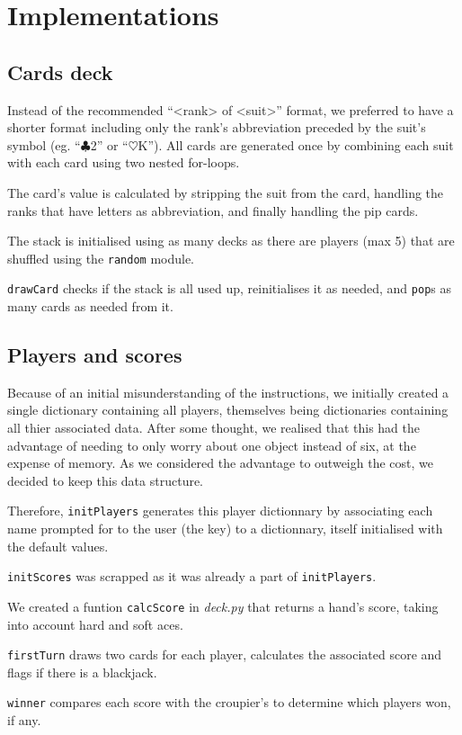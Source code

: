 \documentclass[a4paper, twoside]{report}
\begin{document}
    \section{Implementations}

        \subsection{Cards deck}
            Instead of the recommended ``<rank> of <suit>'' format, we preferred to have a shorter format including only the rank's abbreviation preceded by the suit's symbol (eg. ``$\clubsuit$2'' or ``$\heartsuit$K''). All cards are generated once by combining each suit with each card using two nested for-loops.
            \par The card's value is calculated by stripping the suit from the card, handling the ranks that have letters as abbreviation, and finally handling the pip cards.
            \par The stack is initialised using as many decks as there are players (max 5) that are shuffled using the \texttt{random} module.
            \par \texttt{drawCard} checks if the stack is all used up, reinitialises it as needed, and \texttt{pop}s as many cards as needed from it.

        \subsection{Players and scores}
            Because of an initial misunderstanding of the instructions, we initially created a single dictionary containing all players, themselves being dictionaries containing all thier associated data. After some thought, we realised that this had the advantage of needing to only worry about one object instead of six, at the expense of memory.
            As we considered the advantage to outweigh the cost, we decided to keep this data structure.
            \par Therefore, \texttt{initPlayers} generates this player dictionnary by associating each name prompted for to the user (the key) to a dictionnary, itself initialised with the default values. 
            \par \texttt{initScores} was scrapped as it was already a part of \texttt{initPlayers}.
            \par We created a funtion \texttt{calcScore} in \textit{deck.py} that returns a hand's score, taking into account hard and soft aces.
            \par \texttt{firstTurn} draws two cards for each player, calculates the associated score and flags if there is a blackjack.
            \par \texttt{winner} compares each score with the croupier's to determine which players won, if any.
\end{document}
